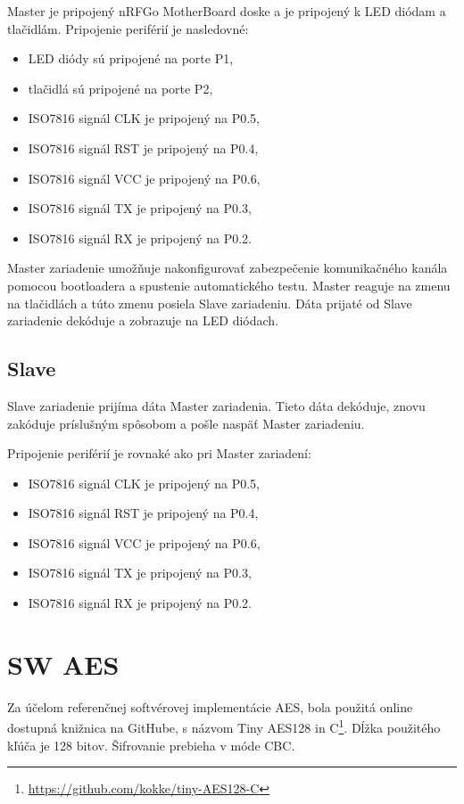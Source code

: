 \documentclass[12pt,a4paper,oneside,openright]{report}
\begin{document}
	Master je pripojený nRFGo MotherBoard doske a je pripojený k LED diódam a tlačidlám. 
	Pripojenie periférií je nasledovné:
	\singlespacing
	\begin{itemize}
		\item LED diódy sú pripojené na porte P1,
		\item tlačidlá sú pripojené na porte P2,
		\item ISO7816 signál CLK je pripojený na P0.5,
		\item ISO7816 signál RST je pripojený na P0.4,
		\item ISO7816 signál VCC je pripojený na P0.6,
		\item ISO7816 signál TX je pripojený na P0.3,
		\item ISO7816 signál RX je pripojený na P0.2.
	\end{itemize}
	\onehalfspacing

	Master zariadenie umožňuje nakonfigurovať zabezpečenie komunikačného kanála pomocou bootloadera a spustenie automatického testu. 
	Master reaguje na zmenu na tlačidlách a túto zmenu posiela Slave zariadeniu. 
	Dáta prijaté od Slave zariadenie dekóduje a zobrazuje na LED diódach.

\subsection{Slave}
	Slave zariadenie prijíma dáta Master zariadenia. Tieto dáta dekóduje, znovu zakóduje príslušným spôsobom a pošle naspäť Master zariadeniu.
	
	\singlespacing
	Pripojenie periférií je rovnaké ako pri Master zariadení:
	\begin{itemize}
		\item ISO7816 signál CLK je pripojený na P0.5,
		\item ISO7816 signál RST je pripojený na P0.4,
		\item ISO7816 signál VCC je pripojený na P0.6,
		\item ISO7816 signál TX je pripojený na P0.3,
		\item ISO7816 signál RX je pripojený na P0.2.
	\end{itemize}
	\onehalfspacing

\section{SW AES}
Za účelom referenčnej softvérovej implementácie AES, bola použitá online dostupná knižnica na GitHube, s názvom Tiny AES128 in C\footnote{\url{https://github.com/kokke/tiny-AES128-C}}. Dĺžka použitého kľúča je 128 bitov. Šifrovanie prebieha v móde CBC.
\end{document}
